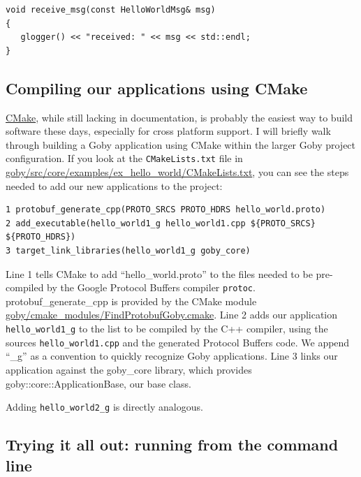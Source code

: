 \documentclass[11pt, letterpaper]{article}
\begin{document}
\begin{verbatim}
void receive_msg(const HelloWorldMsg& msg)
{
   glogger() << "received: " << msg << std::endl;
}
\end{verbatim}

\subsection{Compiling our applications using CMake}

\href{http://www.cmake.org/}{CMake}, while still lacking in documentation, is probably the easiest way to build software these days, especially for cross platform support. I will briefly walk through building a Goby application using CMake within the larger Goby project configuration. If you look at the \texttt{CMakeLists.txt} file in \href{http://bazaar.launchpad.net/~goby-dev/goby/trunk/annotate/head:/src/core/examples/ex1_hello_world/CMakeLists.txt}{goby/src/core/examples/ex\_hello\_world/CMakeLists.txt}, you can see the steps needed to add our new applications to the project:

\begin{verbatim}
1 protobuf_generate_cpp(PROTO_SRCS PROTO_HDRS hello_world.proto)
2 add_executable(hello_world1_g hello_world1.cpp ${PROTO_SRCS} ${PROTO_HDRS})
3 target_link_libraries(hello_world1_g goby_core)
\end{verbatim}

Line 1 tells CMake to add ``hello\_world.proto'' to the files needed to be pre-compiled by the Google Protocol Buffers compiler \texttt{protoc}. protobuf\_generate\_cpp is provided by the CMake module \href{http://bazaar.launchpad.net/~goby-dev/goby/trunk/annotate/head:/cmake_modules/FindProtobufGoby.cmake}{goby/cmake\_modules/FindProtobufGoby.cmake}. Line 2 adds our application \texttt{hello\_world1\_g} to the list to be compiled by the C++ compiler, using the sources \texttt{hello\_world1.cpp} and the generated Protocol Buffers code. We append ``\_g'' as a convention to quickly recognize Goby applications. Line 3 links our application against the goby\_core library, which provides goby::core::ApplicationBase, our base class.

Adding \texttt{hello\_world2\_g} is directly analogous.

\subsection{Trying it all out: running from the command line}
\end{document}
